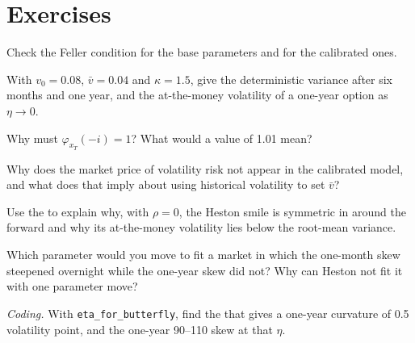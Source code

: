 \section{Exercises}

\begin{exercise}[$\star$]\label{exo:dv:stochastic-volatility:1}
Check the Feller condition for the base parameters and for the calibrated ones.
\end{exercise}

\begin{exercise}[$\star$]\label{exo:dv:stochastic-volatility:2}
With $v_0=0.08$, $\bar v=0.04$ and $\kappa=1.5$, give the deterministic variance after six months and one year,
and the at-the-money volatility of a one-year option as $\eta\to0$.
\end{exercise}

\begin{exercise}[$\star$]\label{exo:dv:stochastic-volatility:3}
Why must $\varphi_{x_T}(-i)=1$? What would a value of 1.01 mean?
\end{exercise}

\begin{exercise}[$\star\star$]\label{exo:dv:stochastic-volatility:4}
Why does the market price of volatility risk not appear in the calibrated model, and what does that imply about
using historical volatility to set $\bar v$?
\end{exercise}

\begin{exercise}[$\star\star$]\label{exo:dv:stochastic-volatility:5}
Use the  to explain why, with $\rho=0$, the Heston smile is symmetric in  around the
forward and why its at-the-money volatility lies below the root-mean variance.
\end{exercise}

\begin{exercise}[$\star\star$]\label{exo:dv:stochastic-volatility:6}
Which parameter would you move to fit a market in which the one-month skew steepened overnight while the one-year
skew did not? Why can Heston not fit it with one parameter move?
\end{exercise}

\begin{exercise}[$\star\star\star$]\label{exo:dv:stochastic-volatility:7}
\emph{Coding.} With \texttt{eta\_for\_butterfly}, find the  that gives a one-year curvature
of 0.5 volatility point, and the one-year 90--110 skew at that $\eta$.
\end{exercise}


